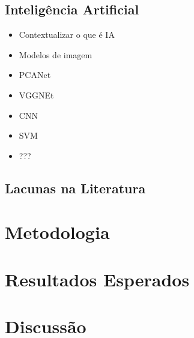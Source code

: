 



\section{Inteligência Artificial}\label{rev_ia}

\begin{itemize}
	\item Contextualizar o que é IA
	\item Modelos de imagem
	\item PCANet
	\item VGGNEt
	\item CNN
	\item SVM
	\item ???
\end{itemize}



\section{Lacunas na Literatura}\label{rev_lacunas}

\chapter{Metodologia}\label{metodologia}

\chapter{Resultados Esperados}\label{result}

\chapter{Discussão}\label{discussao}
